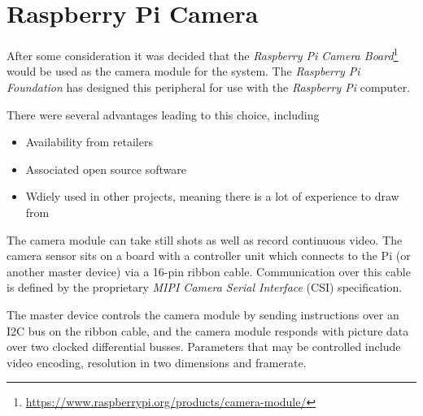 \section{Raspberry Pi Camera}
After some consideration it was decided that the \textit{Raspberry Pi Camera Board}\footnote{\url{https://www.raspberrypi.org/products/camera-module/}} would be used as the camera module for the system.
The \textit{Raspberry Pi Foundation} has designed this peripheral for use with the \textit{Raspberry Pi} computer.

There were several advantages leading to this choice, including
\begin{itemize}
    \item   Availability from retailers
    \item   Associated open source software
    \item   Wdiely used in other projects, meaning there is a lot of experience to draw from
\end{itemize}

The camera module can take still shots as well as record continuous video.
The camera sensor sits on a board with a controller unit which connects to the Pi (or another master device) via a 16-pin ribbon cable.
Communication over this cable is defined by the proprietary \textit{MIPI Camera Serial Interface} (CSI) specification.

The master device controls the camera module by sending instructions over an I2C bus on the ribbon cable,
and the camera module responds with picture data over two clocked differential busses.
Parameters that may be controlled include video encoding, resolution in two dimensions and framerate.

